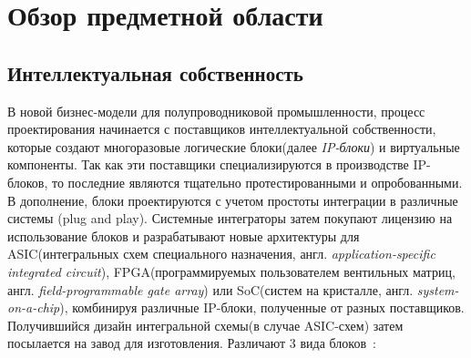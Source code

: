 
\section{Обзор предметной области} %
\label{sec:domain}


\subsection{Интеллектуальная собственность}
\label{sub:domain:ip}
В новой бизнес-модели для полупроводниковой промышленности, процесс проектирования начинается с поставщиков интеллектуальной собственности, которые создают многоразовые
логические блоки(далее \textit{IP-блоки}) и виртуальные компоненты. Так как эти поставщики специализируются в производстве IP-блоков, то последние являются тщательно протестированными и опробованными. В дополнение, блоки проектируются с учетом простоты интеграции в различные системы (plug and play). Системные интеграторы затем покупают лицензию на использование блоков и разрабатывают новые архитектуры для ASIC(интегральных схем специального назначения, англ. \textit{application-specific integrated circuit}), FPGA(программируемых пользователем вентильных матриц, англ. \textit{field-programmable gate array}) или SoC(систем на кристалле, англ. \textit{system-on-a-chip}), комбинируя различные IP-блоки, полученные от разных поставщиков. Получившийся дизайн интегральной схемы(в случае ASIC-схем) затем посылается на завод для изготовления.
Различают 3 вида блоков~\cite{conterfeit_integrated_circuits}:

